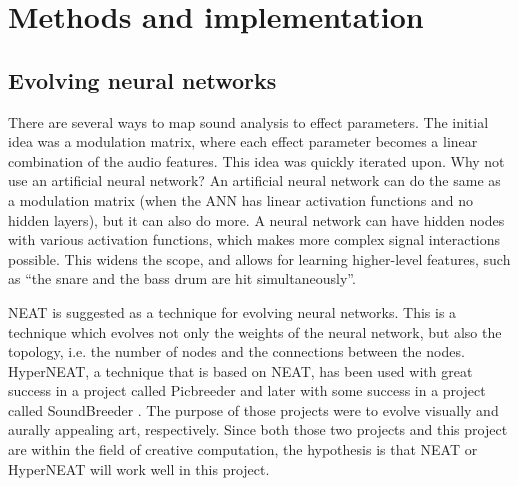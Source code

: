 \chapter{Methods and implementation}

\section{Evolving neural networks}
There are several ways to map sound analysis to effect parameters. The initial idea was a modulation matrix, where each effect parameter becomes a linear combination of the audio features. This idea was quickly iterated upon. Why not use an artificial neural network? An artificial neural network can do the same as a modulation matrix (when the ANN has linear activation functions and no hidden layers), but it can also do more. A neural network can have hidden nodes with various activation functions, which makes more complex signal interactions possible. This widens the scope, and allows for learning higher-level features, such as “the snare and the bass drum are hit simultaneously”.

NEAT \citep{stanley2002} is suggested as a technique for evolving neural networks. This is a technique which evolves not only the weights of the neural network, but also the topology, i.e. the number of nodes and the connections between the nodes. HyperNEAT, a technique that is based on NEAT, has been used with great success in a project called Picbreeder \citep{secretan2008} and later with some success in a project called SoundBreeder \citep{ye2014}. The purpose of those projects were to evolve visually and aurally appealing art, respectively. Since both those two projects and this project are within the field of creative computation, the hypothesis is that NEAT or HyperNEAT will work well in this project.

